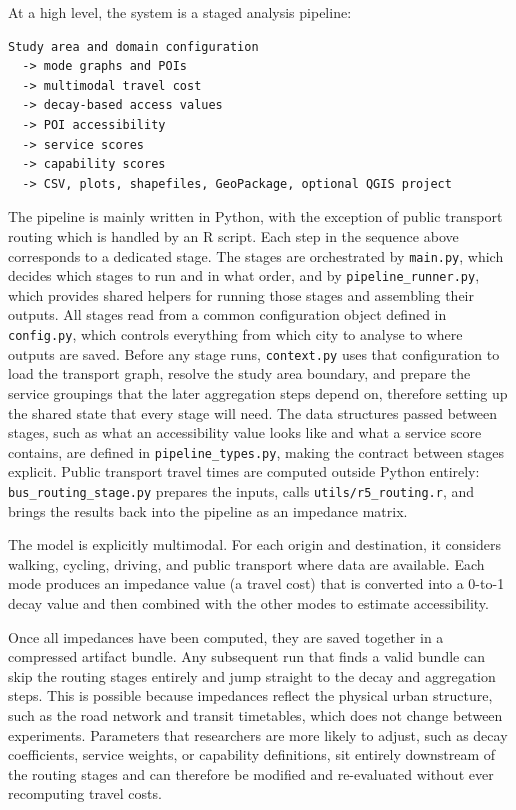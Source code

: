 \documentclass[11pt]{article}
\begin{document}
At a high level, the system is a staged analysis pipeline:

\begin{verbatim}
Study area and domain configuration
  -> mode graphs and POIs
  -> multimodal travel cost
  -> decay-based access values
  -> POI accessibility
  -> service scores
  -> capability scores
  -> CSV, plots, shapefiles, GeoPackage, optional QGIS project
\end{verbatim}

The pipeline is mainly written in Python, with the exception of public transport routing which is handled by an R script. Each step in the sequence above corresponds to a dedicated stage. The stages are orchestrated by \texttt{main.py}, which decides which stages to run and in what order, and by \texttt{pipeline\_runner.py}, which provides shared helpers for running those stages and assembling their outputs. All stages read from a common configuration object defined in \texttt{config.py}, which controls everything from which city to analyse to where outputs are saved. Before any stage runs, \texttt{context.py} uses that configuration to load the transport graph, resolve the study area boundary, and prepare the service groupings that the later aggregation steps depend on, therefore setting up the shared state that every stage will need. The data structures passed between stages, such as what an accessibility value looks like and what a service score contains, are defined in \texttt{pipeline\_types.py}, making the contract between stages explicit. Public transport travel times are computed outside Python entirely: \texttt{bus\_routing\_stage.py} prepares the inputs, calls \texttt{utils/r5\_routing.r}, and brings the results back into the pipeline as an impedance matrix.

The model is explicitly multimodal. For each origin and destination, it considers walking, cycling, driving, and public transport where data are available. Each mode produces an impedance value (a travel cost) that is converted into a 0-to-1 decay value and then combined with the other modes to estimate accessibility.

Once all impedances have been computed, they are saved together in a compressed artifact bundle. Any subsequent run that finds a valid bundle can skip the routing stages entirely and jump straight to the decay and aggregation steps. This is possible because impedances reflect the physical urban structure, such as the road network and transit timetables, which does not change between experiments. Parameters that researchers are more likely to adjust, such as decay coefficients, service weights, or capability definitions, sit entirely downstream of the routing stages and can therefore be modified and re-evaluated without ever recomputing travel costs.
\end{document}
